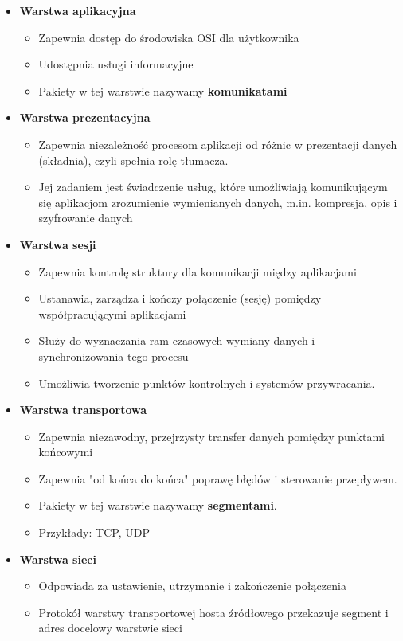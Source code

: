 \documentclass[a4paper,twoside]{article}
\begin{document}
\begin{itemize}
	\item \textbf{Warstwa aplikacyjna}
	\begin{itemize}
		\item Zapewnia dostęp do środowiska OSI dla użytkownika
		\item Udostępnia usługi informacyjne
		\item Pakiety w tej warstwie nazywamy \textbf{komunikatami}
	\end{itemize}
	\item \textbf{Warstwa prezentacyjna}
	\begin{itemize}
		\item Zapewnia niezależność procesom aplikacji od różnic w prezentacji danych (składnia), czyli spełnia rolę tłumacza.
		\item Jej zadaniem jest świadczenie usług, które umożliwiają komunikującym się aplikacjom zrozumienie wymienianych danych, m.in. kompresja, opis i szyfrowanie danych
	\end{itemize}  
	\item \textbf{Warstwa sesji}
	\begin{itemize}
		\item Zapewnia kontrolę struktury dla komunikacji między aplikacjami
		\item Ustanawia, zarządza i kończy połączenie (sesję) pomiędzy współpracującymi aplikacjami
		\item Służy do wyznaczania ram czasowych wymiany danych i synchronizowania tego procesu
		\item Umożliwia tworzenie punktów kontrolnych i systemów przywracania.
	\end{itemize}
	\item \textbf{Warstwa transportowa}
	\begin{itemize}
		\item Zapewnia niezawodny, przejrzysty transfer danych pomiędzy punktami końcowymi
		\item Zapewnia "od końca do końca" poprawę błędów i sterowanie przepływem.
		\item Pakiety w tej warstwie nazywamy \textbf{segmentami}.
		\item Przykłady: TCP, UDP
	\end{itemize}
	\item \textbf{Warstwa sieci}
	\begin{itemize}
		\item Odpowiada za ustawienie, utrzymanie i zakończenie połączenia
		\item Protokół warstwy transportowej hosta źródłowego przekazuje segment i adres docelowy  warstwie sieci

\end{itemize}
\end{itemize}
\end{document}
